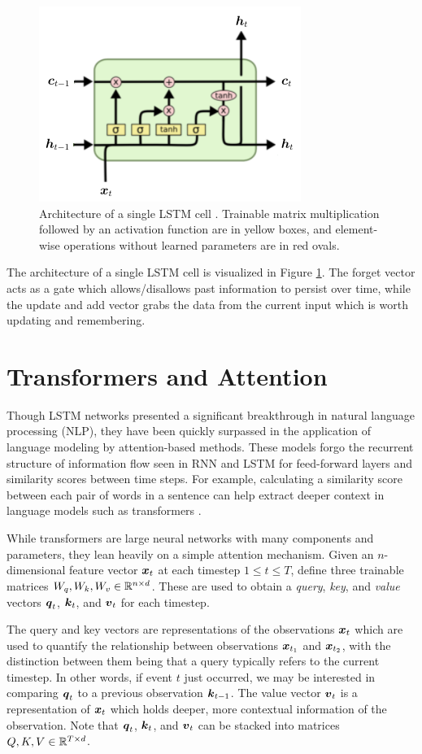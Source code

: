 \begin{figure}[h]
  \centering
  \includegraphics[width=.5\textwidth]{img/lstm_visual}
  \caption{Architecture of a single LSTM cell \cite{olah2015}. Trainable matrix multiplication followed by an activation function are in yellow boxes, and element-wise operations without learned parameters are in red ovals.}
  \label{fig:lstm_visual}
\end{figure}

The architecture of a single LSTM cell is visualized in Figure \ref{fig:lstm_visual}. The forget vector acts as a gate which allows/disallows past information to persist over time, while the update and add vector grabs the data from the current input which is worth updating and remembering.


\section{Transformers and Attention}\label{sec:transformers}
Though LSTM networks presented a significant breakthrough in natural language processing (NLP), they have been quickly surpassed in the application of language modeling by attention-based methods. These models forgo the recurrent structure of information flow seen in RNN and LSTM for feed-forward layers and similarity scores between time steps. For example, calculating a similarity score between each pair of words in a sentence can help extract deeper context in language models such as transformers \cite{vaswani2017}.

While transformers are large neural networks with many components and parameters, they lean heavily on a simple attention mechanism. Given an $n$-dimensional feature vector $\boldsymbol{x}_t$ at each timestep $1\leq t\leq T$, define three trainable matrices $W_q, W_k, W_v \in \mathbb{R}^{n\times d}$. These are used to obtain a \textit{query}, \textit{key}, and \textit{value} vectors $\boldsymbol{q}_t$, $\boldsymbol{k}_t$, and $\boldsymbol{v}_t$ for each timestep. 

The query and key vectors are representations of the observations $\boldsymbol{x}_t$ which are used to quantify the relationship between observations $\boldsymbol{x}_{t_1}$ and $\boldsymbol{x}_{t_2}$, with the distinction between them being that a query typically refers to the current timestep. In other words, if event $t$ just occurred, we may be interested in comparing $\boldsymbol{q}_t$ to a previous observation $\boldsymbol{k}_{t-1}$. The value vector $\boldsymbol{v}_t$ is a representation of $\boldsymbol{x}_t$ which holds deeper, more contextual information of the observation. Note that $\boldsymbol{q}_t$, $\boldsymbol{k}_t$, and $\boldsymbol{v}_t$ can be stacked into matrices $Q,K,V \in \mathbb{R}^{T\times d}$. 

